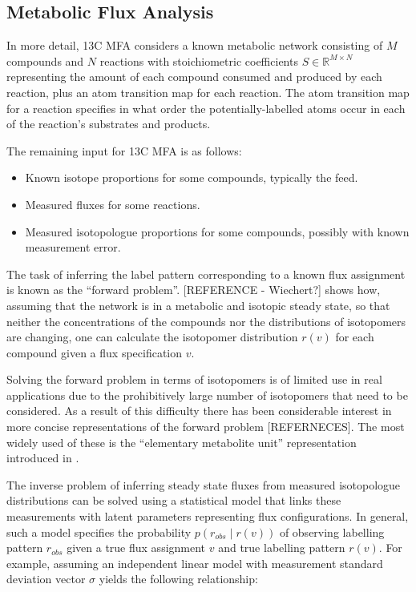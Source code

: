 \documentclass{article}
\begin{document}
\subsection{Metabolic Flux Analysis}\label{metabolic-flux-analysis}

In more detail, 13C MFA considers a known metabolic network consisting
of \(M\) compounds and \(N\) reactions with stoichiometric coefficients
\(S\in\mathbb{R}^{M\times N}\) representing the amount of each compound
consumed and produced by each reaction, plus an atom transition map for
each reaction. The atom transition map for a reaction specifies in what
order the potentially-labelled atoms occur in each of the reaction's
substrates and products.

The remaining input for 13C MFA is as follows:

\begin{itemize}
\item
  Known isotope proportions for some compounds, typically the feed.
\item
  Measured fluxes for some reactions.
\item
  Measured isotopologue proportions for some compounds, possibly with
  known measurement error.
\end{itemize}

The task of inferring the label pattern corresponding to a known flux
assignment is known as the ``forward problem''. {[}REFERENCE -
Wiechert?{]} shows how, assuming that the network is in a metabolic and
isotopic steady state, so that neither the concentrations of the
compounds nor the distributions of isotopomers are changing, one can
calculate the isotopomer distribution \(r(v)\) for each compound given a
flux specification \(v\).

Solving the forward problem in terms of isotopomers is of limited use in
real applications due to the prohibitively large number of isotopomers
that need to be considered. As a result of this difficulty there has
been considerable interest in more concise representations of the
forward problem {[}REFERNECES{]}. The most widely used of these is the
``elementary metabolite unit'' representation introduced in
\citep{antoniewiczElementaryMetaboliteUnits2007}.

The inverse problem of inferring steady state fluxes from measured
isotopologue distributions can be solved using a statistical model that
links these measurements with latent parameters representing flux
configurations. In general, such a model specifies the probability
\(p(r_{obs}\mid r(v))\) of observing labelling pattern \(r_{obs}\) given
a true flux assignment \(v\) and true labelling pattern \(r(v)\). For
example, assuming an independent linear model with measurement standard
deviation vector \(\sigma\) yields the following relationship:
\end{document}
